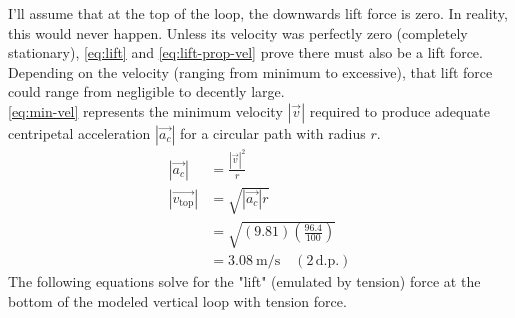 \documentclass[11pt, a4paper]{article}
\begin{document}
	I'll assume that at the top of the loop, the downwards lift force is zero. In reality, this would never happen. Unless its velocity was perfectly zero (completely stationary), \cref{eq:lift} and \cref{eq:lift-prop-vel} prove there must also be a lift force. Depending on the velocity (ranging from minimum to excessive), that lift force could range from negligible to decently large.\\
	\cref{eq:min-vel} represents the minimum velocity $|\vec{v}|$ required to produce adequate centripetal acceleration $|\vec{a_c}|$ for a circular path with radius $r$.
	\begin{align}
		|\vec{a_c}|&=\frac{|\vec{v}|^2}{r}\\
		|\vec{v_{\text{top}}}|&=\sqrt{|\vec{a_c}|r} \label{eq:min-vel}\\
		&=\sqrt{(9.81)\left(\frac{96.4}{100}\right)}\\
		&= \SI{3.08}{\meter\per\second} \quad (2\, \text{d.p.})
	\end{align}
	The following equations solve for the "lift" (emulated by tension) force at the bottom of the modeled vertical loop with tension force.
\end{document}
